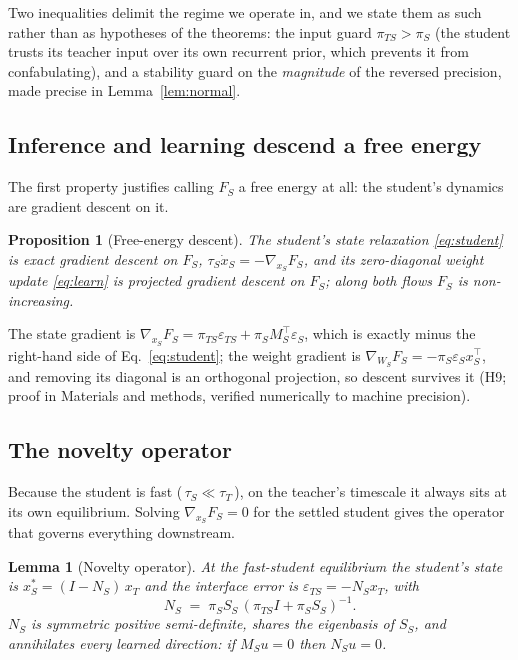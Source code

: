 \documentclass[10pt,letterpaper]{article}
\theoremstyle{plain}
\newtheorem{lemma}{Lemma}
\newtheorem{proposition}{Proposition}
\theoremstyle{remark}
\newcommand{\eps}{\varepsilon}
\newcommand{\xT}{x_T}
\newcommand{\xS}{x_S}
\newcommand{\WS}{W_S}
\newcommand{\MS}{M_S}
\renewcommand{\SS}{S_S}
\newcommand{\NS}{N_S}
\newcommand{\FS}{F_S}
\newcommand{\epsS}{\eps_S}
\newcommand{\epsTS}{\eps_{TS}}
\newcommand{\piS}{\pi_S}
\newcommand{\piTS}{\pi_{TS}}
\newcommand{\tauT}{\tau_T}
\newcommand{\tauS}{\tau_S}
\newcommand{\tr}{^{\!\top}}
\begin{document}
Two inequalities delimit the regime we operate in, and we state them as such rather than as hypotheses
of the theorems: the input guard $\piTS>\piS$ (the student trusts its teacher input over its own
recurrent prior, which prevents it from confabulating), and a stability guard on the \emph{magnitude} of
the reversed precision, made precise in Lemma~\ref{lem:normal}.

\subsection{Inference and learning descend a free energy}
The first property justifies calling $\FS$ a free energy at all: the student's dynamics are gradient
descent on it.

\begin{proposition}[Free-energy descent]
\label{prop:descent}
The student's state relaxation \eqref{eq:student} is exact gradient descent on $\FS$,
$\tauS\dot\xS=-\nabla_{\xS}\FS$, and its zero-diagonal weight update \eqref{eq:learn} is projected
gradient descent on $\FS$; along both flows $\FS$ is non-increasing.
\end{proposition}

The state gradient is $\nabla_{\xS}\FS=\piTS\epsTS+\piS\MS\tr\epsS$, which is exactly minus the
right-hand side of Eq.~\eqref{eq:student}; the weight gradient is
$\nabla_{\WS}\FS=-\piS\epsS\xS\tr$, and removing its diagonal is an orthogonal projection, so descent
survives it (H9; proof in Materials and methods, verified numerically to machine precision).

\subsection{The novelty operator}
Because the student is fast (\,$\tauS\ll\tauT$\,), on the teacher's timescale it always sits at its own
equilibrium. Solving $\nabla_{\xS}\FS=0$ for the settled student gives the operator that governs
everything downstream.

\begin{lemma}[Novelty operator]
\label{lem:novelty}
At the fast-student equilibrium the student's state is
$\xS^{*}=(I-\NS)\,\xT$ and the interface error is $\epsTS=-\NS\xT$, with
\begin{equation}
\label{eq:novelty}
\NS \;=\; \piS \SS\,(\piTS I + \piS \SS)^{-1}.
\end{equation}
$\NS$ is symmetric positive semi-definite, shares the eigenbasis of $\SS$, and annihilates every
learned direction: if $\MS u=0$ then $\NS u=0$.
\end{lemma}
\end{document}
